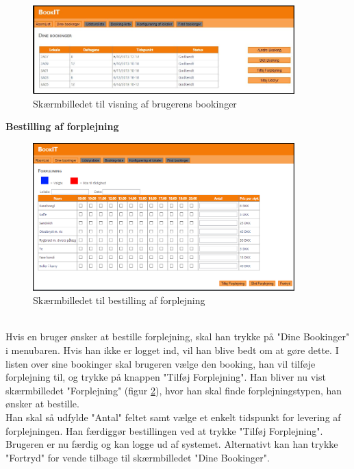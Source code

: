 \begin{figure}[h!]
  \centering
    \includegraphics[width=0.9\textwidth]{Appendix/GUI-Prototype/DigitalMockup/DineBookinger}
  \caption{Skærmbilledet til visning af brugerens bookinger}
\label{Design_G_wf_YourBookings_Final}
\end{figure}

\textbf{Bestilling af forplejning}
\begin{figure}[h!]
  \centering
    \includegraphics[width=0.9\textwidth]{Appendix/GUI-Prototype/DigitalMockup/Forplejning}
  \caption{Skærmbilledet til bestilling af forplejning}
\label{Design_G_wf_Forplejning_Final}
\end{figure} 
\\Hvis en bruger ønsker at bestille forplejning, skal han trykke på "Dine Bookinger" i menubaren. Hvis han ikke er logget ind, vil han blive bedt om at gøre dette. I listen over sine bookinger skal brugeren vælge den booking, han vil tilføje forplejning til, og trykke på knappen "Tilføj Forplejning". Han bliver nu vist skærmbilledet "Forplejning" (figur \ref{Design_G_wf_Forplejning_Final}), hvor han skal finde forplejningstypen, han ønsker at bestille. 
\\Han skal så udfylde "Antal" feltet samt vælge et enkelt tidspunkt for levering af forplejningen. Han færdiggør bestillingen ved at trykke "Tilføj Forplejning". Brugeren er nu færdig og kan logge ud af systemet. Alternativt kan han trykke "Fortryd" for vende tilbage til skærmbilledet "Dine Bookinger".

